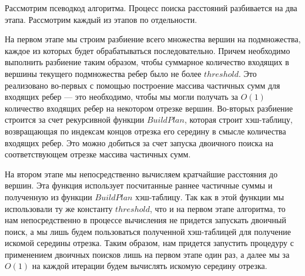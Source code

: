 Рассмотрим псеводкод алгоритма. Процесс поиска расстояний разбивается на два этапа. Рассмотрим каждый из этапов по отдельности.

На первом этапе мы строим разбиение всего множества вершин на подмножества, каждое из которых будет обрабатываться последовательно. Причем необходимо выполнить разбиение таким образом, чтобы суммарное количество входящих в вершины текущего подмножества ребер было не более $threshold$.  Это реализовано во-первых с помощью построение массива частичных сумм для входящих ребер --- это необходимо, чтобы мы могли получать за $O(1)$ количество входящих ребер на некотором отрезке вершин. Во-вторых разбиение строится за счет рекурсивной функции $BuildPlan$, которая строит хэш-таблицу, возвращающая по индексам концов отрезка его середину в смысле количества входящих ребер. Это можно добиться за счет запуска двоичного поиска на соответствующем отрезке массива частичных сумм. 

На втором этапе мы непосредственно вычисляем кратчайшие расстояния до вершин. Эта функция использует посчитанные раннее частичные суммы и полученную из функции $BuildPlan$ хэш-таблицу. Так как в этой функции мы использовали ту же константу $threshold$, что и на первом этапе алгоритма, то нам непосредственно в процессе вычисления не придется запускать двоичный поиск, а мы лишь будем пользоваться полученной хэш-таблицей для получение искомой середины отрезка. Таким образом, нам придется запустить процедуру с применением двоичных поисков лишь на первом этапе один раз, а далее мы за $O(1)$ на каждой итерации будем вычислять искомую середину отрезка. 


